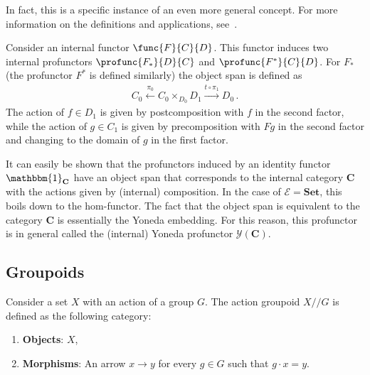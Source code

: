     In fact, this is a specific instance of an even more general concept. For more information on the definitions and applications, see~\citet{mac_lane_categories_2013, johnstone_topos_2014}.

    \begin{construct}
        Consider an internal functor $\func{F}{C}{D}$. This functor induces two internal profunctors $\profunc{F_*}{D}{C}$ and $\profunc{F^*}{C}{D}$. For $F_*$ (the profunctor $F^*$ is defined similarly) the object span is defined as
        \begin{gather}
            C_0\overset{\pi_0}{\longleftarrow}C_0\times_{D_0} D_1\overset{t\circ\pi_1}{\longrightarrow}D_0\,.
        \end{gather}
        The action of $f\in D_1$ is given by postcomposition with $f$ in the second factor, while the action of $g\in C_1$ is given by precomposition with $Fg$ in the second factor and changing to the domain of $g$ in the first factor.

        It can easily be shown that the profunctors induced by an identity functor $\mathbbm{1}_{\mathbf{C}}$ have an object span that corresponds to the internal category $\mathbf{C}$ with the actions given by (internal) composition. In the case of $\mathcal{E}=\mathbf{Set}$, this boils down to the hom-functor. The fact that the object span is equivalent to the category $\mathbf{C}$ is essentially the Yoneda embedding. For this reason, this profunctor is in general called the (internal) Yoneda profunctor $\mathcal{Y}(\mathbf{C})$.
    \end{construct}

\subsection{Groupoids}\label{section:groupoids}


    \begin{example}\label{cat:action_groupoid}
        Consider a set $X$ with an action of a group $G$. The action groupoid $X/\!\!/G$ is defined as the following category:
        \begin{enumerate}
            \item\textbf{Objects}: $X$,
            \item\textbf{Morphisms}: An arrow $x\rightarrow y$ for every $g\in G$ such that $g\cdot x=y$.
        \end{enumerate}
    \end{example}

